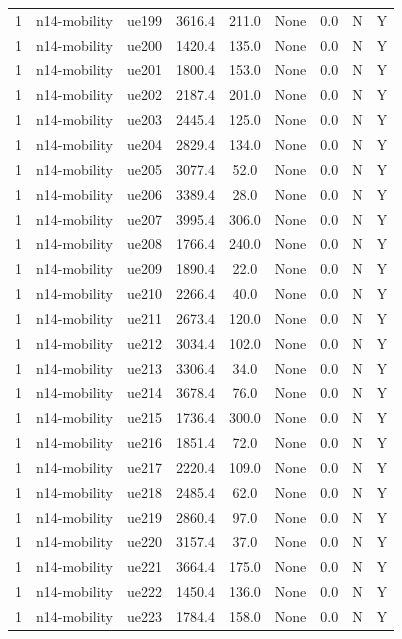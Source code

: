 \begin{table}[ht]
\begin{tabular}{|c|c|c|c|c|c|c|c|c|}
1 & n14-mobility & ue199 & 3616.4 & 211.0 & None & 0.0 & N & Y \\
1 & n14-mobility & ue200 & 1420.4 & 135.0 & None & 0.0 & N & Y \\
1 & n14-mobility & ue201 & 1800.4 & 153.0 & None & 0.0 & N & Y \\
1 & n14-mobility & ue202 & 2187.4 & 201.0 & None & 0.0 & N & Y \\
1 & n14-mobility & ue203 & 2445.4 & 125.0 & None & 0.0 & N & Y \\
1 & n14-mobility & ue204 & 2829.4 & 134.0 & None & 0.0 & N & Y \\
1 & n14-mobility & ue205 & 3077.4 & 52.0 & None & 0.0 & N & Y \\
1 & n14-mobility & ue206 & 3389.4 & 28.0 & None & 0.0 & N & Y \\
1 & n14-mobility & ue207 & 3995.4 & 306.0 & None & 0.0 & N & Y \\
1 & n14-mobility & ue208 & 1766.4 & 240.0 & None & 0.0 & N & Y \\
1 & n14-mobility & ue209 & 1890.4 & 22.0 & None & 0.0 & N & Y \\
1 & n14-mobility & ue210 & 2266.4 & 40.0 & None & 0.0 & N & Y \\
1 & n14-mobility & ue211 & 2673.4 & 120.0 & None & 0.0 & N & Y \\
1 & n14-mobility & ue212 & 3034.4 & 102.0 & None & 0.0 & N & Y \\
1 & n14-mobility & ue213 & 3306.4 & 34.0 & None & 0.0 & N & Y \\
1 & n14-mobility & ue214 & 3678.4 & 76.0 & None & 0.0 & N & Y \\
1 & n14-mobility & ue215 & 1736.4 & 300.0 & None & 0.0 & N & Y \\
1 & n14-mobility & ue216 & 1851.4 & 72.0 & None & 0.0 & N & Y \\
1 & n14-mobility & ue217 & 2220.4 & 109.0 & None & 0.0 & N & Y \\
1 & n14-mobility & ue218 & 2485.4 & 62.0 & None & 0.0 & N & Y \\
1 & n14-mobility & ue219 & 2860.4 & 97.0 & None & 0.0 & N & Y \\
1 & n14-mobility & ue220 & 3157.4 & 37.0 & None & 0.0 & N & Y \\
1 & n14-mobility & ue221 & 3664.4 & 175.0 & None & 0.0 & N & Y \\
1 & n14-mobility & ue222 & 1450.4 & 136.0 & None & 0.0 & N & Y \\
1 & n14-mobility & ue223 & 1784.4 & 158.0 & None & 0.0 & N & Y \\

\end{tabular}
\end{table}
